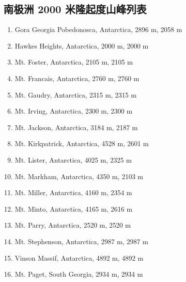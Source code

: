 \documentclass[10pt,twocolumn,letterpaper]{article}
\begin{document}
\subsection{南极洲 2000 米隆起度山峰列表}

\begin{flushleft}
\begin{enumerate}
    \item Gora Georgia Pobedonosca, Antarctica, 2896 m, 2058 m
    \item Hawkes Heights, Antarctica, 2000 m, 2000 m
    \item Mt. Foster, Antarctica, 2105 m, 2105 m
    \item Mt. Francais, Antarctica, 2760 m, 2760 m
    \item Mt. Gaudry, Antarctica, 2315 m, 2315 m
    \item Mt. Irving, Antarctica, 2300 m, 2300 m
    \item Mt. Jackson, Antarctica, 3184 m, 2187 m
    \item Mt. Kirkpatrick, Antarctica, 4528 m, 2601 m
    \item Mt. Lister, Antarctica, 4025 m, 2325 m
    \item Mt. Markham, Antarctica, 4350 m, 2103 m
    \item Mt. Miller, Antarctica, 4160 m, 2354 m
    \item Mt. Minto, Antarctica, 4165 m, 2616 m
    \item Mt. Parry, Antarctica, 2520 m, 2520 m
    \item Mt. Stephenson, Antarctica, 2987 m, 2987 m
    \item Vinson Massif, Antarctica, 4892 m, 4892 m
    \item Mt. Paget, South Georgia, 2934 m, 2934 m
\end{enumerate}
\end{flushleft}

\clearpage
\twocolumn

{\small


}
\end{document}
